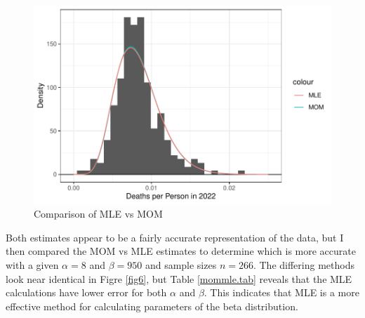 \documentclass{article}\usepackage[]{graphicx}\usepackage[]{xcolor}
\begin{document}
\begin{multicols}{2}
\begin{figure}[H]
 \begin{center}
 \includegraphics[scale=0.45]{estimator_comparison.pdf}
 \caption{Comparison of MLE vs MOM}
 \label{fig5}
 \end{center}
 \end{figure}
 
Both estimates appear to be a fairly accurate representation of the data, but I then compared the MOM vs MLE estimates to determine which is more accurate with a given $\alpha=8$ and $\beta=950$ and sample sizes $n=266$. The differing methods look near identical in Figre \ref{fig6}, but Table \ref{mommle.tab} reveals that the MLE calculations have lower error for both $\alpha$ and $\beta$. This indicates that MLE is a more effective method for calculating parameters of the beta distribution.
 

\end{multicols}
\end{document}
